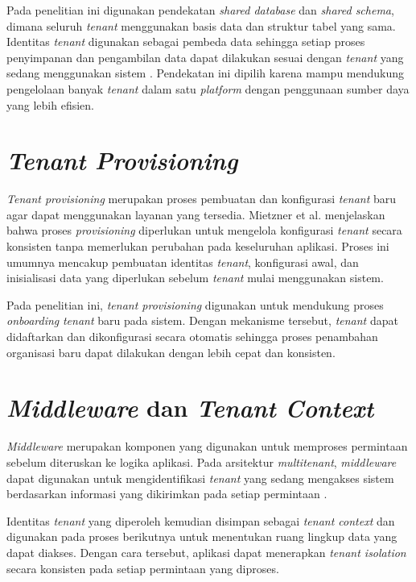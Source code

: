 Pada penelitian ini digunakan pendekatan \textit{shared database} dan \textit{shared schema}, dimana seluruh \textit{tenant} menggunakan basis data dan struktur tabel yang sama. Identitas \textit{tenant} digunakan sebagai pembeda data sehingga setiap proses penyimpanan dan pengambilan data dapat dilakukan sesuai dengan \textit{tenant} yang sedang menggunakan sistem \cite{ref6,ref9}. Pendekatan ini dipilih karena mampu mendukung pengelolaan banyak \textit{tenant} dalam satu \textit{platform} dengan penggunaan sumber daya yang lebih efisien.

\section{\textit{Tenant Provisioning}}

\textit{Tenant provisioning} merupakan proses pembuatan dan konfigurasi \textit{tenant} baru agar dapat menggunakan layanan yang tersedia. Mietzner et al. \cite{ref8} menjelaskan bahwa proses \textit{provisioning} diperlukan untuk mengelola konfigurasi \textit{tenant} secara konsisten tanpa memerlukan perubahan pada keseluruhan aplikasi. Proses ini umumnya mencakup pembuatan identitas \textit{tenant}, konfigurasi awal, dan inisialisasi data yang diperlukan sebelum \textit{tenant} mulai menggunakan sistem.

Pada penelitian ini, \textit{tenant provisioning} digunakan untuk mendukung proses \textit{onboarding} \textit{tenant} baru pada sistem. Dengan mekanisme tersebut, \textit{tenant} dapat didaftarkan dan dikonfigurasi secara otomatis sehingga proses penambahan organisasi baru dapat dilakukan dengan lebih cepat dan konsisten.

\section{\textit{Middleware} dan \textit{Tenant Context}}

\textit{Middleware} merupakan komponen yang digunakan untuk memproses permintaan sebelum diteruskan ke logika aplikasi. Pada arsitektur \textit{multitenant}, \textit{middleware} dapat digunakan untuk mengidentifikasi \textit{tenant} yang sedang mengakses sistem berdasarkan informasi yang dikirimkan pada setiap permintaan \cite{ref7}.

Identitas \textit{tenant} yang diperoleh kemudian disimpan sebagai \textit{tenant context} dan digunakan pada proses berikutnya untuk menentukan ruang lingkup data yang dapat diakses. Dengan cara tersebut, aplikasi dapat menerapkan \textit{tenant isolation} secara konsisten pada setiap permintaan yang diproses.
